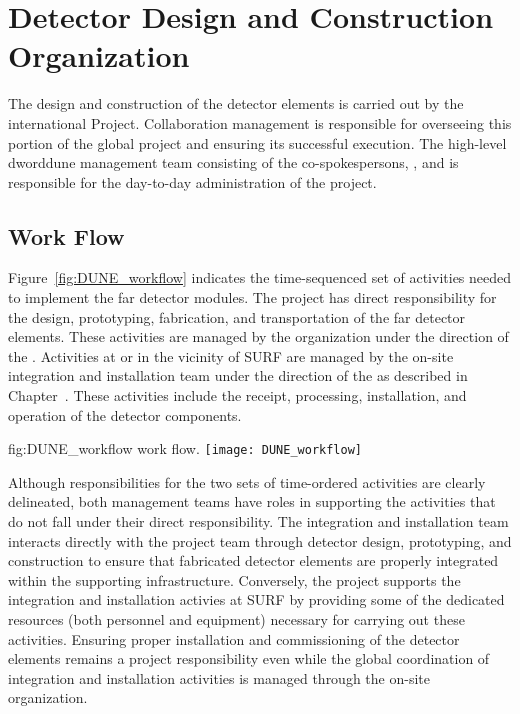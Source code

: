 ﻿\chapter{Detector Design and Construction Organization}
\label{vl:tc-overview}

The design and construction of the  detector elements is 
carried out by the international  Project.  
Collaboration management is responsible for overseeing this portion 
of the global project and ensuring its successful execution.  
The high-level dword{dune} management team consisting of the 
co-spokespersons, , and  is responsible 
for the day-to-day administration of the project.  

\section{ Work Flow}
\label{sec:workflow}

Figure~\ref{fig:DUNE_workflow} indicates the time-sequenced set of 
activities needed to implement the  far detector modules.
The  project has direct responsibility for the design, 
prototyping, fabrication, and transportation of the far detector 
elements.  These activities are managed by the   
organization under the direction of the .  Activities at 
or in the vicinity of SURF are managed by the on-site integration and
installation team under the direction of the  as described 
in Chapter~\label{ch:tc-jpo}.  These activities include the receipt,
processing, installation, and operation of the detector components.            
\begin{dunefigure}{fig:DUNE_workflow}
  { work flow.}
  \texttt{[image: DUNE\_workflow]}
\end{dunefigure}

Although responsibilities for the two sets of time-ordered activities 
are clearly delineated, both management teams have roles in supporting
the activities that do not fall under their direct responsibility.  The 
integration and installation team interacts directly with the  
project team through detector design, prototyping, and construction to 
ensure that fabricated detector elements are properly integrated within 
the supporting infrastructure.  Conversely, the  project 
supports the integration and installation activies at SURF by providing 
some of the dedicated resources (both personnel and equipment) necessary 
for carrying out these activities.  Ensuring proper installation and 
commissioning of the detector elements remains a  project
responsibility even while the global coordination of integration and 
installation activities is managed through the on-site organization.  

